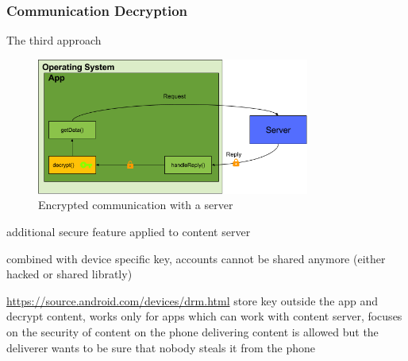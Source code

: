 \subsubsection{Communication Decryption} \label{section:counter-replace-encryption-content-communication}
The third approach
\begin{figure}[h]
    \centering
    \includegraphics[width=0.8\textwidth]{data/encryptionComm.png}
    \caption{Encrypted communication with a server}
    \label{fig:encryptionComm}
\end{figure}

additional secure feature applied to content server

combined with device specific key, accounts cannot be shared anymore (either hacked or shared libratly)


\url{https://source.android.com/devices/drm.html} store key outside the app and decrypt content, works only for apps which can work with content server, focuses on the security of content on the phone\newline
delivering content is allowed but the deliverer wants to be sure that nobody steals it from the phone
